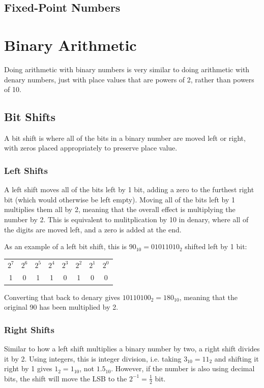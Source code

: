     \subsection{Fixed-Point Numbers}

    \newpage

\section{Binary Arithmetic} \label{binary_arithmetic}
    Doing arithmetic with binary numbers is very similar to doing arithmetic with denary numbers, just with place values that are powers of 2, rather than powers of 10.

    \subsection{Bit Shifts}
        A bit shift is where all of the bits in a binary number are moved left or right, with zeros placed appropriately to preserve place value.

        \subsubsection{Left Shifts}
            A left shift moves all of the bits left by 1 bit, adding a zero to the furthest right bit (which would otherwise be left empty).
            Moving all of the bits left by 1 multiplies them all by 2, meaning that the overall effect is multiplying the number by 2.
            This is equivalent to mulitplication by 10 in denary, where all of the digits are moved left, and a zero is added at the end.
            
            As an example of a left bit shift, this is $90_{10}=01011010_2$ shifted left by 1 bit:
            \begin{center}
            \begin{tabular}{c c c c c c c c}
                $2^7$&$2^6$&$2^5$&$2^4$&$2^3$&$2^2$&$2^1$&$2^0$ \\
                1  &  0  &  1  &  1  &  0  &  1  &  0  &  0
            \end{tabular}
            \end{center}
            Converting that back to denary gives $10110100_2=180_{10}$, meaning that the original 90 has been multiplied by 2.

        \subsubsection{Right Shifts}
            Similar to how a left shift multiplies a binary number by two, a right shift divides it by 2.
            Using integers, this is integer division, i.e. taking $3_{10}=11_2$ and shifting it right by 1 gives $1_2=1_{10}$, not $1.5_{10}$.
            However, if the number is also using decimal bits, the shift will move the LSB to the $2^{-1}=\frac{1}{2}$ bit.

